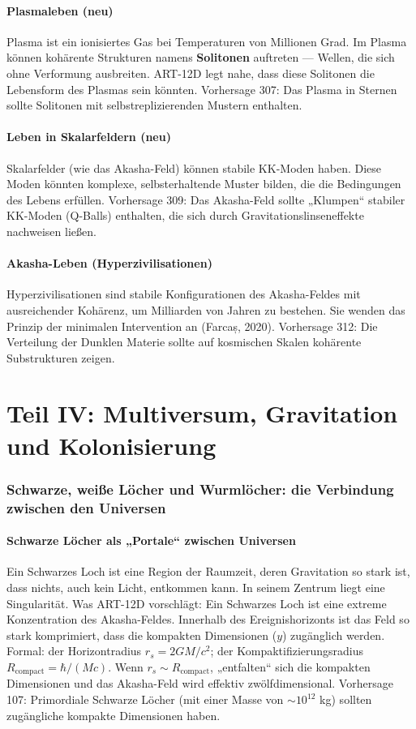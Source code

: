 \documentclass[11pt,a4paper]{article}
\begin{document}
\subsection{Plasmaleben (neu)}
Plasma ist ein ionisiertes Gas bei Temperaturen von Millionen Grad. Im Plasma können kohärente Strukturen namens \textbf{Solitonen} auftreten --- Wellen, die sich ohne Verformung ausbreiten. ART-12D legt nahe, dass diese Solitonen die Lebensform des Plasmas sein könnten. Vorhersage 307: Das Plasma in Sternen sollte Solitonen mit selbstreplizierenden Mustern enthalten.

\subsection{Leben in Skalarfeldern (neu)}
Skalarfelder (wie das Akasha-Feld) können stabile KK-Moden haben. Diese Moden könnten komplexe, selbsterhaltende Muster bilden, die die Bedingungen des Lebens erfüllen. Vorhersage 309: Das Akasha-Feld sollte „Klumpen`` stabiler KK-Moden (Q-Balls) enthalten, die sich durch Gravitationslinseneffekte nachweisen ließen.

\subsection{Akasha-Leben (Hyperzivilisationen)}
Hyperzivilisationen sind stabile Konfigurationen des Akasha-Feldes mit ausreichender Kohärenz, um Milliarden von Jahren zu bestehen. Sie wenden das Prinzip der minimalen Intervention an (Farcaș, 2020). Vorhersage 312: Die Verteilung der Dunklen Materie sollte auf kosmischen Skalen kohärente Substrukturen zeigen.

\newpage
\part*{Teil IV: Multiversum, Gravitation und Kolonisierung}

\section{Schwarze, weiße Löcher und Wurmlöcher: die Verbindung zwischen den Universen}
\subsection{Schwarze Löcher als „Portale`` zwischen Universen}
Ein Schwarzes Loch ist eine Region der Raumzeit, deren Gravitation so stark ist, dass nichts, auch kein Licht, entkommen kann. In seinem Zentrum liegt eine Singularität. Was ART-12D vorschlägt: Ein Schwarzes Loch ist eine extreme Konzentration des Akasha-Feldes. Innerhalb des Ereignishorizonts ist das Feld so stark komprimiert, dass die kompakten Dimensionen ($y$) zugänglich werden. Formal: der Horizontradius $r_s = 2GM/c^2$; der Kompaktifizierungsradius $R_{\text{compact}} = \hbar/(Mc)$. Wenn $r_s \sim R_{\text{compact}}$, „entfalten`` sich die kompakten Dimensionen und das Akasha-Feld wird effektiv zwölfdimensional. Vorhersage 107: Primordiale Schwarze Löcher (mit einer Masse von $\sim 10^{12}$ kg) sollten zugängliche kompakte Dimensionen haben.
\end{document}

